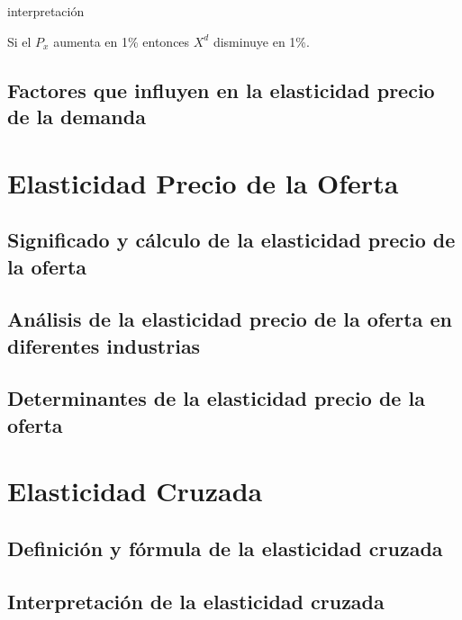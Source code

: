 \documentclass[
  jou,
  floatsintext,
  longtable,
  a4paper,
  nolmodern,
  notxfonts,
  notimes,
  12pt,
  colorlinks=true,linkcolor=blue,citecolor=blue,urlcolor=blue]{apa7}
\begin{document}
interpretación

Si el \(P_x\) aumenta en 1\% entonces \(X^d\) disminuye en 1\%.

\subsection{Factores que influyen en la elasticidad precio de la
demanda}\label{factores-que-influyen-en-la-elasticidad-precio-de-la-demanda}

\section{Elasticidad Precio de la
Oferta}\label{elasticidad-precio-de-la-oferta}

\subsection{Significado y cálculo de la elasticidad precio de la
oferta}\label{significado-y-cuxe1lculo-de-la-elasticidad-precio-de-la-oferta}

\subsection{Análisis de la elasticidad precio de la oferta en diferentes
industrias}\label{anuxe1lisis-de-la-elasticidad-precio-de-la-oferta-en-diferentes-industrias}

\subsection{Determinantes de la elasticidad precio de la
oferta}\label{determinantes-de-la-elasticidad-precio-de-la-oferta}

\section{Elasticidad Cruzada}\label{elasticidad-cruzada}

\subsection{Definición y fórmula de la elasticidad
cruzada}\label{definiciuxf3n-y-fuxf3rmula-de-la-elasticidad-cruzada}

\subsection{Interpretación de la elasticidad
cruzada}\label{interpretaciuxf3n-de-la-elasticidad-cruzada}
\end{document}
